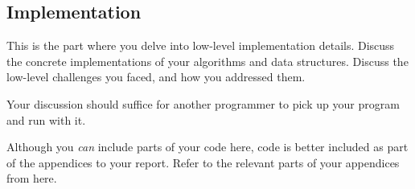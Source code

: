 \subsection{Implementation}

\label{sec:implementation}

This is the part where you delve into low-level implementation details. Discuss
the concrete implementations of your algorithms and data structures. Discuss
the low-level challenges you faced, and how you addressed them.

Your discussion should suffice for another programmer to pick up your
program and run with it.

Although you \emph{can} include parts of your code here, code is better
included as part of the appendices to your report. Refer to the relevant parts
of your appendices from here.
